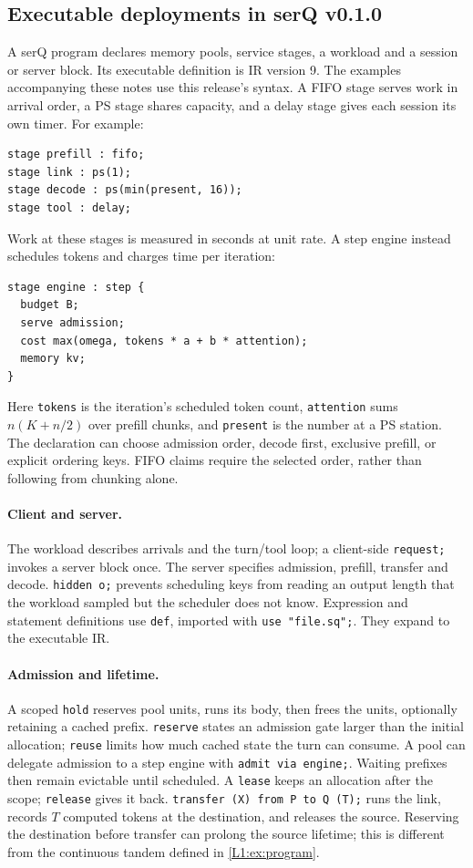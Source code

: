 \subsection{Executable deployments in serQ v0.1.0}\label{L1:sec:language}

A serQ program declares memory pools, service stages, a workload and a
session or server block. Its executable definition is IR version 9.
The examples accompanying these notes use this release's syntax.
A FIFO stage serves work in arrival order, a PS stage shares capacity,
and a delay stage gives each session its own timer. For example:
\begin{verbatim}
stage prefill : fifo;
stage link : ps(1);
stage decode : ps(min(present, 16));
stage tool : delay;
\end{verbatim}
Work at these stages is measured in seconds at unit rate.
A step engine instead schedules tokens and charges time per iteration:
\begin{verbatim}
stage engine : step {
  budget B;
  serve admission;
  cost max(omega, tokens * a + b * attention);
  memory kv;
}
\end{verbatim}
Here \texttt{tokens} is the iteration's scheduled token count,
\texttt{attention} sums $n(K+n/2)$ over prefill chunks, and
\texttt{present} is the number at a PS station. The declaration can choose
admission order, decode first, exclusive prefill, or explicit ordering keys.
FIFO claims require the selected order, rather than following from chunking alone.

\paragraph{Client and server.} The workload describes arrivals and the turn/tool
loop; a client-side \texttt{request;} invokes a server block once.
The server specifies admission, prefill, transfer and decode.
\texttt{hidden o;} prevents scheduling keys from reading an output length
that the workload sampled but the scheduler does not know.
Expression and statement definitions use \texttt{def}, imported with
\texttt{use "file.sq";}. They expand to the executable IR.

\paragraph{Admission and lifetime.} A scoped \texttt{hold} reserves pool units,
runs its body, then frees the units, optionally retaining a cached prefix.
\texttt{reserve} states an admission gate larger than the initial allocation;
\texttt{reuse} limits how much cached state the turn can consume.
A pool can delegate admission to a step engine with \texttt{admit via engine;}.
Waiting prefixes then remain evictable until scheduled. A \texttt{lease}
keeps an allocation after the scope; \texttt{release} gives it back.
\texttt{transfer (X) from P to Q (T);} runs the link, records $T$ computed
tokens at the destination, and releases the source. Reserving the destination
before transfer can prolong the source lifetime; this is different from the
continuous tandem defined in \cref{L1:ex:program}.

